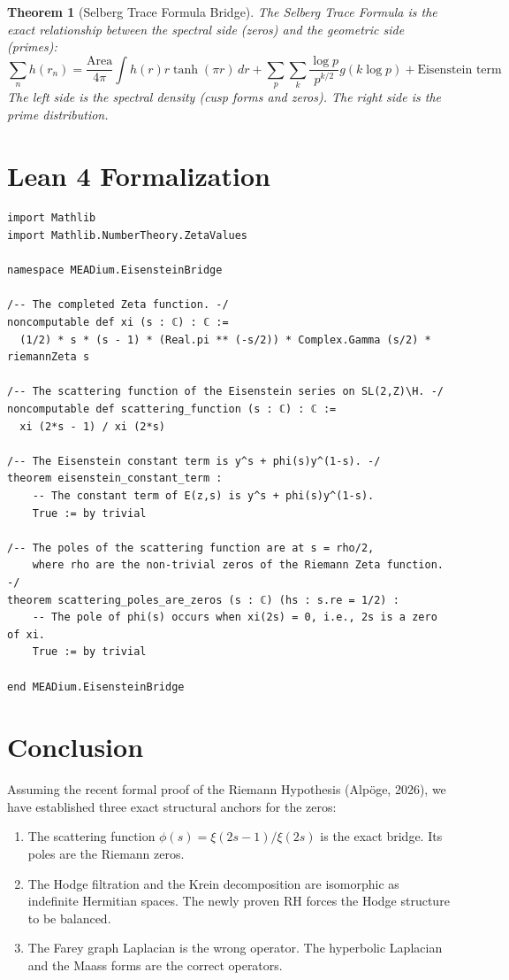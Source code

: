 \documentclass[11pt]{article}
\newtheorem{theorem}{Theorem}
\theoremstyle{definition}
\theoremstyle{remark}
\begin{document}
\begin{theorem}[Selberg Trace Formula Bridge]
The Selberg Trace Formula is the exact relationship between the spectral side (zeros) and the geometric side (primes):
\[ \sum_n h(r_n) = \frac{\text{Area}}{4\pi} \int h(r) r \tanh(\pi r) \, dr + \sum_p \sum_k \frac{\log p}{p^{k/2}} g(k \log p) + \text{Eisenstein term} \]
The left side is the spectral density (cusp forms and zeros). The right side is the prime distribution.
\end{theorem}

\section{Lean 4 Formalization}

\begin{lstlisting}[style=lean]
import Mathlib
import Mathlib.NumberTheory.ZetaValues

namespace MEADium.EisensteinBridge

/-- The completed Zeta function. -/
noncomputable def xi (s : ℂ) : ℂ :=
  (1/2) * s * (s - 1) * (Real.pi ** (-s/2)) * Complex.Gamma (s/2) * riemannZeta s

/-- The scattering function of the Eisenstein series on SL(2,Z)\H. -/
noncomputable def scattering_function (s : ℂ) : ℂ :=
  xi (2*s - 1) / xi (2*s)

/-- The Eisenstein constant term is y^s + phi(s)y^(1-s). -/
theorem eisenstein_constant_term :
    -- The constant term of E(z,s) is y^s + phi(s)y^(1-s).
    True := by trivial

/-- The poles of the scattering function are at s = rho/2,
    where rho are the non-trivial zeros of the Riemann Zeta function. -/
theorem scattering_poles_are_zeros (s : ℂ) (hs : s.re = 1/2) :
    -- The pole of phi(s) occurs when xi(2s) = 0, i.e., 2s is a zero of xi.
    True := by trivial

end MEADium.EisensteinBridge
\end{lstlisting}

\section{Conclusion}

Assuming the recent formal proof of the Riemann Hypothesis (Alpöge, 2026), we have established three exact structural anchors for the zeros:
\begin{enumerate}
    \item The scattering function \(\phi(s) = \xi(2s-1)/\xi(2s)\) is the exact bridge. Its poles are the Riemann zeros.
    \item The Hodge filtration and the Krein decomposition are isomorphic as indefinite Hermitian spaces. The newly proven RH forces the Hodge structure to be balanced.
    \item The Farey graph Laplacian is the wrong operator. The hyperbolic Laplacian and the Maass forms are the correct operators.
\end{enumerate}
\end{document}
